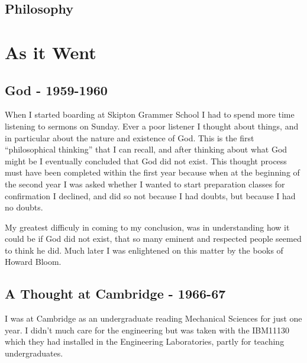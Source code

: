 \documentclass{rbjk}
\begin{document}
\begin{article}
\subsection{Philosophy}

\section{As it Went}

\subsection{God - 1959-1960}

When I started boarding at Skipton Grammer School I had to spend more time listening to sermons on Sunday.
Ever a poor listener I thought about things, and in particular about the nature and existence of God.
This is the first ``philosophical thinking'' that I can recall, and after thinking about what God might be I eventually concluded that God did not exist.
This thought process must have been completed within the first year because when at the beginning of the second year I was asked whether I wanted to start preparation classes for confirmation I declined, and did so not because I had doubts, but because I had no doubts.

My greatest difficuly in coming to my conclusion, was in understanding how it could be if God did not exist, that so many eminent and respected people seemed to think he did.
Much later I was enlightened on this matter by the books of Howard Bloom.

\subsection{A Thought at Cambridge - 1966-67}

I was at Cambridge as an undergraduate reading Mechanical Sciences for just one year.
I didn't much care for the engineering but was taken with the IBM11130 which they had installed in the Engineering Laboratories, partly for teaching undergraduates.


\end{article}
\end{document}
